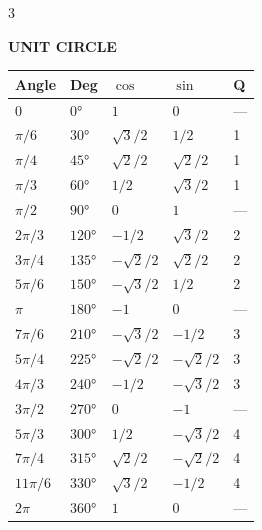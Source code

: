 \documentclass[6pt,letterpaper]{article}
\newcommand{\shead}[3]{%
  \noindent\colorbox{#1}{\parbox{\dimexpr\linewidth-2\fboxsep\relax}%
  {\color{#2}\bfseries\fontsize{6}{7}\selectfont #3}}\vspace{0.5pt}}
\begin{document}
\begin{multicols}{3}
\vspace{2pt}
\shead{graybg}{gray}{UNIT CIRCLE}
\begin{ebox}
\centering
\begin{tabular}{@{}lllll@{}}
\toprule
Angle & Deg & $\cos$ & $\sin$ & Q\\
\midrule
\rowcolor{rowB}$0$ & $0°$ & $1$ & $0$ & —\\
$\pi/6$ & $30°$ & $\sqrt{3}/2$ & $1/2$ & 1\\
\rowcolor{rowB}$\pi/4$ & $45°$ & $\sqrt{2}/2$ & $\sqrt{2}/2$ & 1\\
$\pi/3$ & $60°$ & $1/2$ & $\sqrt{3}/2$ & 1\\
\rowcolor{rowB}$\pi/2$ & $90°$ & $0$ & $1$ & —\\
$2\pi/3$ & $120°$ & $-1/2$ & $\sqrt{3}/2$ & 2\\
\rowcolor{rowB}$3\pi/4$ & $135°$ & $-\sqrt{2}/2$ & $\sqrt{2}/2$ & 2\\
$5\pi/6$ & $150°$ & $-\sqrt{3}/2$ & $1/2$ & 2\\
\rowcolor{rowB}$\pi$ & $180°$ & $-1$ & $0$ & —\\
$7\pi/6$ & $210°$ & $-\sqrt{3}/2$ & $-1/2$ & 3\\
\rowcolor{rowB}$5\pi/4$ & $225°$ & $-\sqrt{2}/2$ & $-\sqrt{2}/2$ & 3\\
$4\pi/3$ & $240°$ & $-1/2$ & $-\sqrt{3}/2$ & 3\\
\rowcolor{rowB}$3\pi/2$ & $270°$ & $0$ & $-1$ & —\\
$5\pi/3$ & $300°$ & $1/2$ & $-\sqrt{3}/2$ & 4\\
\rowcolor{rowB}$7\pi/4$ & $315°$ & $\sqrt{2}/2$ & $-\sqrt{2}/2$ & 4\\
$11\pi/6$ & $330°$ & $\sqrt{3}/2$ & $-1/2$ & 4\\
\rowcolor{rowB}$2\pi$ & $360°$ & $1$ & $0$ & —\\
\bottomrule
\end{tabular}
\end{ebox}

\end{multicols}
\end{document}
